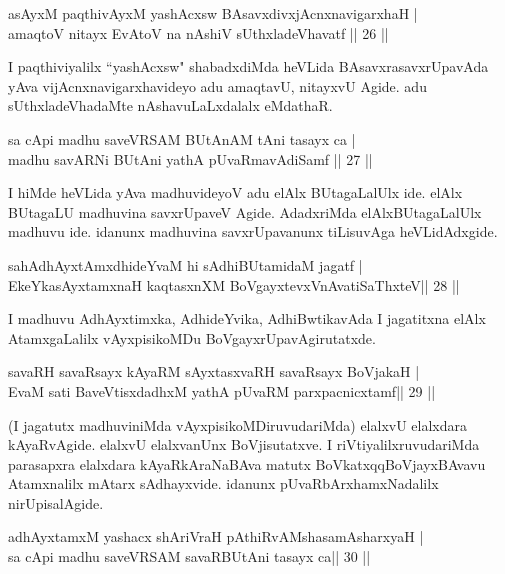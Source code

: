 \begin{shl}
asAyxM paqthivAyxM yashAcxsw BAsavxdivxjAcnxnavigarxhaH |\\
amaqtoV nitayx EvAtoV na nAshiV sUthxladeVhavatf \hfill || 26 || 
\end{shl}
\begin{artha}
I paqthiviyalilx ``yashAcxsw" shabadxdiMda heVLida  BAsavxrasavxrUpavAda yAva vijAcnxnavigarxhavideyo adu amaqtavU, nitayxvU Agide. adu sUthxladeVhadaMte nAshavuLaLxdalalx eMdathaR. 
\end{artha}
\begin{shl}
sa cApi madhu saveVRSAM BUtAnAM tAni tasayx ca |\\
madhu savARNi BUtAni yathA pUvaRmavAdiSamf \hfill || 27 || 
\end{shl}
\begin{artha}
I hiMde heVLida yAva madhuvideyoV adu elAlx BUtagaLalUlx ide. elAlx BUtagaLU madhuvina savxrUpaveV Agide. AdadxriMda elAlxBUtagaLalUlx madhuvu ide. idanunx madhuvina savxrUpavanunx tiLisuvAga heVLidAdxgide.    
\end{artha}
\begin{shl}
sahAdhAyxtAmxdhideYvaM hi sAdhiBUtamidaM jagatf |\\
EkeYkasAyx\s \s tamxnaH kaqtasxnXM BoVgayxtevxVnAvatiSaThxteV\hfill  || 28 || 
\end{shl}
\begin{artha}
I madhuvu AdhAyxtimxka, AdhideYvika, AdhiBwtikavAda I jagatitxna elAlx AtamxgaLalilx vAyxpisikoMDu BoVgayxrUpavAgirutatxde. 
\end{artha}
\begin{shl}
savaRH savaRsayx kAyaRM sAyxtasxvaRH savaRsayx BoVjakaH |\\
EvaM sati BaveVtisxdadhxM yathA pUvaRM parxpacnicxtamf\hfill  || 29 ||
\end{shl}
\begin{artha}
(I jagatutx madhuviniMda vAyxpisikoMDiruvudariMda) elalxvU elalxdara kAyaRvAgide. elalxvU elalxvanUnx BoVjisutatxve. I riVtiyalilxruvudariMda parasapxra elalxdara kAyaRkAraNaBAva matutx BoVkatxqqBoVjayxBAvavu Atamxnalilx mAtarx sAdhayxvide. idanunx pUvaRbArxhamxNadalilx nirUpisalAgide.  
\end{artha}
\begin{shl}
adhAyxtamxM yashacx shAriVraH pAthiRvAMshasamAsharxyaH |\\
sa cApi madhu saveVRSAM savaRBUtAni tasayx ca\hfill  || 30 || 
\end{shl}

